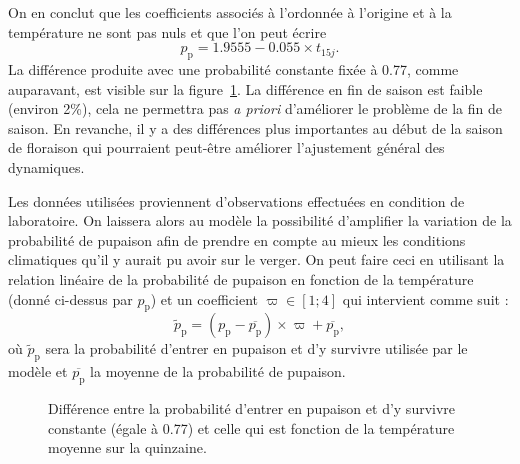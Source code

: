On en conclut que les coefficients associés à l'ordonnée à l'origine et à la température ne sont pas nuls et que l'on peut écrire
\[
p_{\text{p}} = 1.9555 - 0.055\times t_{15j}.
\]
La différence produite avec une probabilité constante fixée à 0.77, comme auparavant, est visible sur la figure~\ref{fig:pupaison}.
La différence en fin de saison est faible (environ 2\%), cela ne permettra pas \emph{a priori} d'améliorer le problème de la fin de saison.
En revanche, il y a des différences plus importantes au début de la saison de floraison qui pourraient peut-être améliorer l'ajustement général des dynamiques.

Les données utilisées proviennent d'observations effectuées en condition de laboratoire.
On laissera alors au modèle la possibilité d'amplifier la variation de la probabilité de pupaison afin de prendre en compte au mieux les conditions climatiques qu'il y aurait pu avoir sur le verger.
On peut faire ceci en utilisant la relation linéaire de la probabilité de pupaison en fonction de la température (donné ci-dessus par $p_{\text{p}}$) et un coefficient $\varpi\in [1;4]$ qui intervient comme suit :
\[
\widetilde p_{\text{p}} = \left( p_{\text{p}} - \overline{p_{\text{p}}} \right) \times \varpi + \overline{p_{\text{p}}},
\]
où $\widetilde p_{\text{p}}$ sera la probabilité d'entrer en pupaison et d'y survivre utilisée par le modèle et $\overline{p_{\text{p}}}$ la moyenne de la probabilité de pupaison.

\begin{figure}[ht]
 \centering
 \caption{Différence entre la probabilité d'entrer en pupaison et d'y survivre constante (égale à 0.77) et celle qui est fonction de la température moyenne sur la quinzaine.}
 \label{fig:pupaison}
\end{figure}
%


